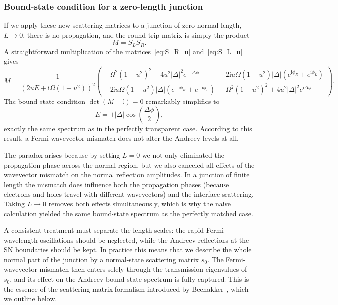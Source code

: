 \documentclass[11pt,a4paper,twoside,openany]{report}
\begin{document}
\subsubsection{Bound-state condition for a zero-length junction}

If we apply these new scattering matrices to a junction of zero normal length, $L \rightarrow0$, there is no propagation, and the round-trip matrix
is simply the product
\begin{equation}
  M = S_L S_R .
  \label{eq:M_zero}
\end{equation}
A straightforward multiplication of the matrices~\eqref{eq:S_R_u} and~\eqref{eq:S_L_u} gives
\begin{equation}
  M = \frac{1}{(2uE+\mathrm{i}\Omega(1+u^2))^2}
      \begin{pmatrix}
        -\Omega^2(1-u^2)^2 + 4u^2|\Delta|^2 e^{-\mathrm{i}\Delta\phi} &
        -2\mathrm{i}u\Omega(1-u^2)|\Delta|(e^{\mathrm{i}\phi_R}+e^{\mathrm{i}\phi_L}) \\[6pt]
        -2\mathrm{i}u\Omega(1-u^2)|\Delta|(e^{-\mathrm{i}\phi_R}+e^{-\mathrm{i}\phi_L}) &
        -\Omega^2(1-u^2)^2 + 4u^2|\Delta|^2 e^{\mathrm{i}\Delta\phi}
      \end{pmatrix}.
  \label{eq:M_explicit}
\end{equation}
The bound-state condition $\det(M-\mathbb{I})=0$ remarkably simplifies to
\begin{equation}
  E = \pm |\Delta| \cos\!\left(\frac{\Delta\phi}{2}\right),
  \label{eq:ABS_same}
\end{equation}
exactly the same spectrum as in the perfectly transparent case. According to this result, a Fermi-wavevector mismatch does not alter the Andreev levels at all.

The paradox arises because by setting $L=0$ we not only eliminated the propagation phase across the normal region, but we also canceled all effects of the wavevector mismatch on the normal reflection amplitudes.  In a junction of finite length the mismatch does influence both the propagation phases (because electrons and holes travel with different wavevectors) and the interface scattering. Taking $L\to0$ removes both effects simultaneously, which is why the naive calculation yielded the same bound-state spectrum as the perfectly matched case.

A consistent treatment must separate the length scales: the rapid Fermi-wavelength oscillations should be neglected, while the Andreev reflections at the SN boundaries should be kept. In practice this means that we describe the whole normal part of the junction by a normal-state scattering matrix $s_0$. The Fermi-wavevector mismatch then enters solely through the transmission eigenvalues of $s_0$, and its effect on the Andreev bound-state spectrum is fully captured. This is the essence of the scattering-matrix formalism introduced by Beenakker~\cite{beenaker_1992}, which we outline below.
\end{document}
